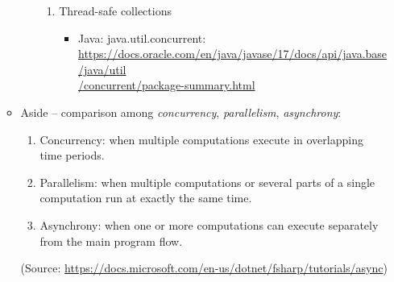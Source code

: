 \documentclass{article}
\begin{document}
\begin{itemize}
\begin{itemize}
\begin{itemize}
            \begin{enumerate}
                \item Thread-safe collections
                    \begin{itemize}
                    \item Java: java.util.concurrent:\\
                    \href{https://docs.oracle.com/en/java/javase/17/docs/api/java.base/java/util/concurrent/package-summary.html}{https://docs.oracle.com/en/java/javase/17/docs/api/java.base/java/util\\/concurrent/package-summary.html}
                    \end{itemize}
            \end{enumerate}
        \end{itemize}
        \item Aside -- comparison among \emph{concurrency}, \emph{parallelism}, \emph{asynchrony}:
        \begin{enumerate}
            \item Concurrency: when multiple computations execute in overlapping time periods.
            \item Parallelism: when multiple computations or several parts of a single computation run at exactly the same time.
            \item Asynchrony: when one or more computations can execute separately from the main program flow.
        \end{enumerate}
        (Source: \href{https://docs.microsoft.com/en-us/dotnet/fsharp/tutorials/async}{https://docs.microsoft.com/en-us/dotnet/fsharp/tutorials/async})
    \end{itemize}
\end{itemize}
\end{document}
